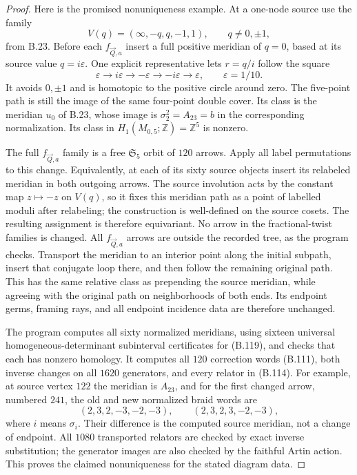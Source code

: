 \begin{proof}
Here is the promised nonuniqueness example.  At a
one-node source use the family
\[
 V(q)=(\infty,-q,q,-1,1),\qquad q\ne0,\pm1,
\]
from B.23.  Before each $f_{\vec Q,a}$ insert a full
positive meridian of $q=0$, based at its source value
$q=i\varepsilon$.  One explicit representative lets
$r=q/i$ follow the square
\[
 \varepsilon\longrightarrow i\varepsilon
   \longrightarrow-\varepsilon\longrightarrow-i\varepsilon
   \longrightarrow\varepsilon,
 \qquad\varepsilon=1/10.                                     \tag{B.119}
\]
It avoids $0,\pm1$ and is homotopic to the positive circle
around zero.  The five-point path is still the image of
the same four-point double cover.  Its class is the
meridian $u_0$ of B.23, whose image is
$\sigma_2^2=A_{23}=b$ in the corresponding normalization.
Its class in $H_1(M_{0,5};\mathbb Z)=\mathbb Z^5$ is nonzero.

The full $f_{\vec Q,a}$ family is a free
$\mathfrak S_5$ orbit of $120$ arrows.  Apply all label
permutations to this change.  Equivalently, at each of
its sixty source objects insert its relabeled meridian
in both outgoing arrows.  The source involution acts
by the constant map $z\mapsto-z$ on $V(q)$, so it fixes
this meridian path as a point of labelled moduli after
relabeling; the construction is well-defined on the
source cosets.  The resulting assignment is therefore
equivariant.  No arrow in the fractional-twist families
is changed.  All $f_{\vec Q,a}$ arrows are outside the
recorded tree, as the program checks.  Transport the meridian to an interior point along the
initial subpath, insert that conjugate loop there, and
then follow the remaining original path.  This has the
same relative class as prepending the source meridian,
while agreeing with the original path on neighborhoods
of both ends.  Its endpoint germs, framing rays, and
all endpoint incidence data are therefore unchanged.

The program computes all sixty normalized meridians,
using sixteen universal homogeneous-determinant
subinterval certificates for (B.119), and checks that
each has nonzero homology.  It computes all $120$
correction words (B.111), both inverse changes on all
$1620$ generators, and every relator in (B.114).
For example, at source vertex $122$ the meridian is
$A_{23}$, and for the first changed arrow, numbered
$241$, the old and new normalized braid words are
\[
 (2,3,2,-3,-2,-3),\qquad (2,3,2,3,-2,-3),
                                                               \tag{B.120}
\]
where $i$ means $\sigma_i$.  Their difference is the
computed source meridian, not a change of endpoint.
All $1080$ transported relators are checked by exact
inverse substitution; the generator images are also
checked by the faithful Artin action.  This proves the
claimed nonuniqueness for the stated diagram data.


\end{proof}
